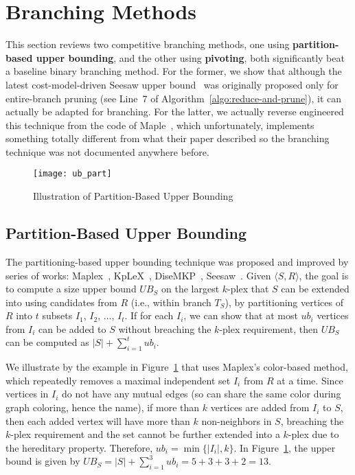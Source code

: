 \documentclass[sigconf, nonacm]{acmart}
\begin{document}
\section{Branching Methods}\label{sec:branch}
This section reviews two competitive branching methods, one using {\bf partition-based upper bounding}, and the other using {\bf pivoting}, both significantly beat a baseline binary branching method. For the former, we show that although the latest cost-model-driven Seesaw upper bound~\cite{seesaw} was originally proposed only for entire-branch pruning (see Line~7 of Algorithm~\ref{algo:reduce-and-prune}), it can actually be adapted for branching. For the latter, we actually reverse engineered this technique from the code of Maple~\cite{Maple}, which unfortunately, implements something totally different from what their paper described so the branching technique was not documented anywhere before.

\begin{figure}[t]
  \texttt{[image: ub\_part]}
  \vspace{-6mm}
  \caption{Illustration of Partition-Based Upper Bounding}\label{fig:ub_part}
\end{figure}

\vspace{-2mm}
\subsection{Partition-Based Upper Bounding}\label{ssec:pub}
The partitioning-based upper bounding technique was proposed and improved by series of works: Maplex~\cite{Maplex}, KpLeX~\cite{KpLeX-MKP}, DiseMKP~\cite{DiseMKP}, Seesaw~\cite{seesaw}. Given $\langle S,R\rangle$, the goal is to compute a size upper bound $UB_S$ on the largest $k$-plex that $S$ can be extended into using candidates from $R$ (i.e., within branch $T_S$), by partitioning vertices of $R$ into $t$ subsets $I_1$, $I_2$, $\ldots$, $I_t$. If for each $I_i$, we can show that at most $ub_i$ vertices from $I_i$ can be added to $S$ without breaching the $k$-plex requirement, then $UB_S$ can be computed as $|S|+\sum_{i=1}^t ub_i$.

We illustrate by the example in Figure~\ref{fig:ub_part} that uses Maplex's color-based method, which repeatedly removes a maximal independent set $I_i$ from $R$ at a time. Since vertices in $I_i$ do not have any mutual edges (so can share the same color during graph coloring, hence the name), if more than $k$ vertices are added from $I_i$ to $S$, then each added vertex will have more than $k$ non-neighbors in $S$, breaching the $k$-plex requirement and the set cannot be further extended into a $k$-plex due to the hereditary property. Therefore, $ub_i=\min\{|I_i|, k\}$.
%
In Figure~\ref{fig:ub_part}, the upper bound is given by $UB_S=|S|+\sum_{i=1}^3 ub_i=5+3+3+2=13$.
\end{document}
